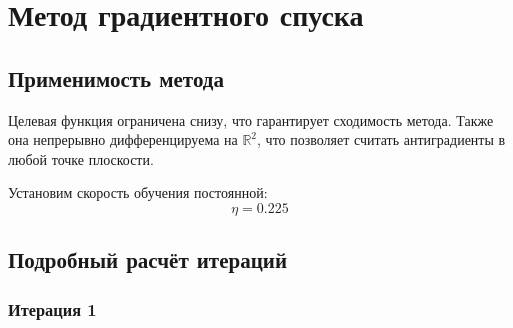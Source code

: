 \documentclass[12pt]{article}
\begin{document}
\newpage

\section{Метод градиентного спуска}

\subsection{Применимость метода}

Целевая функция ограничена снизу, что гарантирует сходимость метода. Также она непрерывно дифференцируема на \( \mathbb{R}^2 \), что позволяет считать антиградиенты в любой точке плоскости.

Установим скорость обучения постоянной:
\[
  \eta = 0.225
\]

\subsection{Подробный расчёт итераций}
\subsubsection{Итерация 1}
\end{document}
